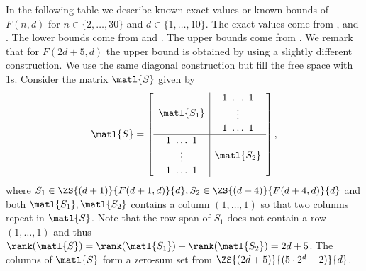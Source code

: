
In the following table we describe known exact values or known bounds of $F(n,d)$ for $n \in \{2,\dots,30\}$ and $d \in \{1,\dots,10\}$. The exact values come from ,  and . The lower bounds come from  and . The upper bounds come from . We remark that for $F(2d+5,d)$ the upper bound is obtained by using a slightly different construction. We use the same diagonal construction but fill the free space with 1s. Consider the matrix $\matl{S}$ given by 
$$
\matl{S} = \left[\begin{array}{c|c}
    \matl{S_1}
&
    \begin{array}{c}1~\ldots~1 \\ \vdots \\ 1~\ldots~1\end{array}
\\
\hline
    \begin{array}{c}1~\ldots~1 \\ \vdots \\ 1~\ldots~1\end{array}
&
    \matl{S_2}
\end{array} \right],
$$
where $S_1 \in \ZS{(d+1)}{F(d+1,d)}{d}, S_2 \in \ZS{(d+4)}{F(d+4,d)}{d}$ and both $\matl{S_1},\matl{S_2}$ contains a column $(1,\ldots,1)$ so that two columns repeat in $\matl{S}$. Note that the row span of $S_1$ does not contain a row $(1,\ldots,1)$ and thus $\rank(\matl{S})=\rank(\matl{S_1})+\rank(\matl{S_2})=2d+5$. The columns of $\matl{S}$ form a zero-sum set from $\ZS{(2d+5)}{(5\cdot 2^{d}-2)}{d}$.


